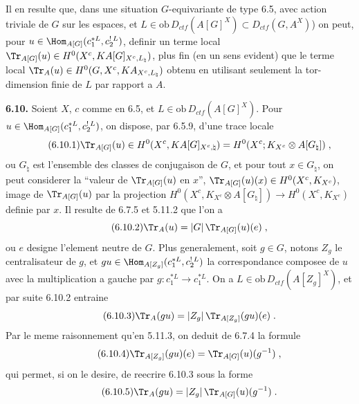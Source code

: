Il en resulte que, dans une situation $G$-equivariante de type 6.5, avec action triviale de $G$ sur les espaces, et $L \in \mathrm{ob}\, D_{ctf}(A[G]^X) \subset D_{ctf}(G, A^X)$) on peut, pour $u \in \Hom_{A[G]}(c_1^{*L}, c_2^{!\,L})$, definir un terme local $\Tr_{A[G]}(u) \in H^0(X^c, KA[G]_{X^c,L_\natural})$, plus fin (en un sens evident) que le terme local $\Tr_A(u) \in H^0(G, X^c, KA_{X^c,L_\natural})$ obtenu en utilisant seulement la tor-dimension finie de $L$ par rapport a $A$.

\medskip
\noindent\textbf{6.10.} Soient $X$, $c$ comme en 6.5, et $L \in \mathrm{ob}\, D_{ctf}(A[G]^X)$. Pour $u \in \Hom_{A[G]}(c_1^{*L}, c_2^{!\,L})$, on dispose, par 6.5.9, d'une trace locale
\begin{equation}\tag{6.10.1}
\Tr_{A[G]}(u) \in H^0(X^c, KA[G]_{X^c,\natural}) = H^0(X^c; K_{X^c} \otimes A[G_\natural])\;,
\end{equation}
ou $G_\natural$ est l'ensemble des classes de conjugaison de $G$, et pour tout $x \in G_\natural$, on peut considerer la ``valeur de $\Tr_{A[G]}(u)$ en $x$'', $\Tr_{A[G]}(u)(x) \in H^0(X^c, K_{X^c})$, image de $\Tr_{A[G]}(u)$ par la projection $H^0(X^c, K_{X^c} \otimes A[G_\natural]) \longrightarrow H^0(X^c, K_{X^c})$ definie par $x$. Il resulte de 6.7.5 et 5.11.2 que l'on a
\begin{equation}\tag{6.10.2}
\Tr_A(u) = |G|\,\Tr_{A[G]}(u)(e)\;,
\end{equation}
ou $e$ designe l'element neutre de $G$. Plus generalement, soit $g \in G$, notons $Z_g$ le centralisateur de $g$, et $gu \in \Hom_{A[Z_g]}(c_1^{*L}, c_2^{!\,L})$ la correspondance composee de $u$ avec la multiplication a gauche par $g : c_1^{*L} \longrightarrow c_1^{*L}$. On a $L \in \mathrm{ob}\, D_{ctf}(A[Z_g]^X)$, et par suite 6.10.2 entraine
\begin{equation}\tag{6.10.3}
\Tr_A(gu) = |Z_g|\,\Tr_{A[Z_g]}(gu)(e)\;.
\end{equation}
Par le meme raisonnement qu'en 5.11.3, on deduit de 6.7.4 la formule
\begin{equation}\tag{6.10.4}
\Tr_{A[Z_g]}(gu)(e) = \Tr_{A[G]}(u)(g^{-1})\;,
\end{equation}
qui permet, si on le desire, de reecrire 6.10.3 sous la forme
\begin{equation}\tag{6.10.5}
\Tr_A(gu) = |Z_g|\,\Tr_{A[G]}(u)(g^{-1})\;.
\end{equation}

